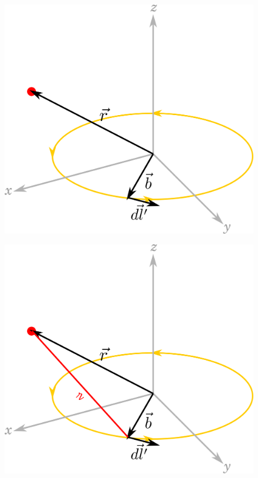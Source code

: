 \documentclass[10pt,aspectratio=169]{beamer}
\begin{document}
	\begin{frame}
		\begin{figure}[!htb]
			\centering
			\includegraphics[scale=0.6]{dip-3}
		\end{figure}
	\end{frame}
	
	\begin{frame}
		\begin{figure}[!htb]
			\centering
			\includegraphics[scale=0.6]{dip-4}
		\end{figure}
	\end{frame}
\end{document}
